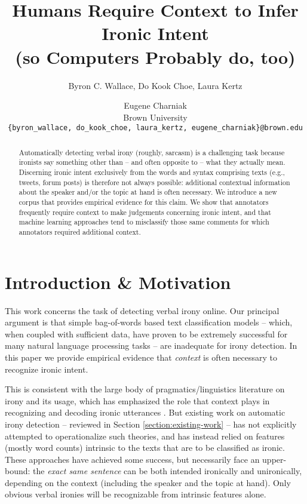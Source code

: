 \documentclass[11pt]{article}
\title{Humans Require Context to Infer Ironic Intent\\(so Computers Probably do, too)}
\author{Byron C. Wallace, Do Kook Choe, Laura Kertz \and Eugene Charniak \\
		Brown University \\
		{\tt \{byron\_wallace, do\_kook\_choe, laura\_kertz, eugene\_charniak\}@brown.edu}}
\date{}
\begin{document}
\maketitle

\begin{abstract}
\fontsize{10}{10}
Automatically detecting verbal irony (roughly, sarcasm) is a challenging task because ironists say something other than -- and often opposite to -- what they actually mean. Discerning ironic intent exclusively from the words and syntax comprising texts (e.g., tweets, forum posts) is therefore not always possible: additional contextual information about the speaker and/or the topic at hand is often necessary. We introduce a new corpus that provides empirical evidence for this claim. We show that annotators frequently require context to make judgements concerning ironic intent, and that machine learning approaches tend to misclassify those same comments for which annotators required additional context. 
\end{abstract}

\section{Introduction \& Motivation}
\label{section:intro-and-motivation}

This work concerns the task of detecting verbal irony online. Our principal argument is that simple bag-of-words based text classification models -- which, when coupled with sufficient data, have proven to be extremely successful for many natural language processing tasks \cite{halevy-09} -- are inadequate for irony detection. In this paper we provide empirical evidence that \emph{context} is often necessary to recognize ironic intent.

This is consistent with the large body of pragmatics/linguistics literature on irony and its usage, which has emphasized the role that context plays in recognizing and decoding ironic utterances \cite{grice_75,clark_84,sperber_81}. But existing work on automatic irony detection -- reviewed in Section \ref{section:existing-work} -- has not explicitly attempted to operationalize such theories, and has instead relied on features (mostly word counts) intrinsic to the texts that are to be classified as ironic. These approaches have achieved some success, but necessarily face an upper-bound: the \emph{exact same sentence} can be both intended ironically and unironically, depending on the context (including the speaker and the topic at hand). Only obvious verbal ironies will be recognizable from intrinsic features alone.
\end{document}
